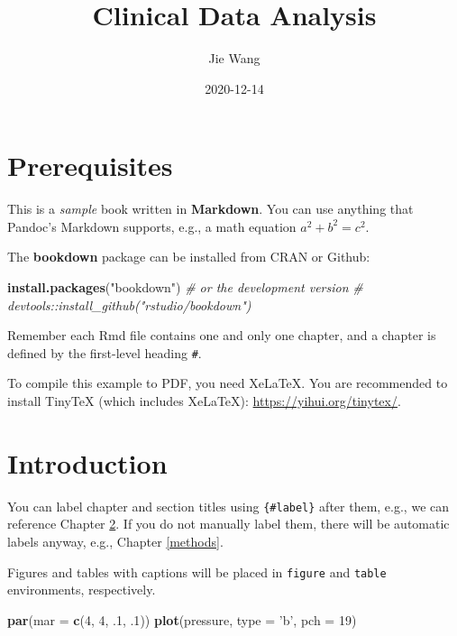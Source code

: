 \documentclass[
]{book}
\title{Clinical Data Analysis}
\author{Jie Wang}
\date{2020-12-14}
\newenvironment{Shaded}{\begin{snugshade}}{\end{snugshade}}
\newcommand{\CommentTok}[1]{\textcolor[rgb]{0.56,0.35,0.01}{\textit{#1}}}
\newcommand{\DataTypeTok}[1]{\textcolor[rgb]{0.13,0.29,0.53}{#1}}
\newcommand{\DecValTok}[1]{\textcolor[rgb]{0.00,0.00,0.81}{#1}}
\newcommand{\FloatTok}[1]{\textcolor[rgb]{0.00,0.00,0.81}{#1}}
\newcommand{\KeywordTok}[1]{\textcolor[rgb]{0.13,0.29,0.53}{\textbf{#1}}}
\newcommand{\NormalTok}[1]{#1}
\newcommand{\StringTok}[1]{\textcolor[rgb]{0.31,0.60,0.02}{#1}}
\begin{document}
\maketitle

{
\setcounter{tocdepth}{1}
\tableofcontents
}
\hypertarget{prerequisites}{%
\chapter{Prerequisites}\label{prerequisites}}

This is a \emph{sample} book written in \textbf{Markdown}. You can use anything that Pandoc's Markdown supports, e.g., a math equation \(a^2 + b^2 = c^2\).

The \textbf{bookdown} package can be installed from CRAN or Github:

\begin{Shaded}
\begin{Highlighting}[]
\KeywordTok{install.packages}\NormalTok{(}\StringTok{"bookdown"}\NormalTok{)}
\CommentTok{# or the development version}
\CommentTok{# devtools::install_github("rstudio/bookdown")}
\end{Highlighting}
\end{Shaded}

Remember each Rmd file contains one and only one chapter, and a chapter is defined by the first-level heading \texttt{\#}.

To compile this example to PDF, you need XeLaTeX. You are recommended to install TinyTeX (which includes XeLaTeX): \url{https://yihui.org/tinytex/}.

\hypertarget{intro}{%
\chapter{Introduction}\label{intro}}

You can label chapter and section titles using \texttt{\{\#label\}} after them, e.g., we can reference Chapter \ref{intro}. If you do not manually label them, there will be automatic labels anyway, e.g., Chapter \ref{methods}.

Figures and tables with captions will be placed in \texttt{figure} and \texttt{table} environments, respectively.

\begin{Shaded}
\begin{Highlighting}[]
\KeywordTok{par}\NormalTok{(}\DataTypeTok{mar =} \KeywordTok{c}\NormalTok{(}\DecValTok{4}\NormalTok{, }\DecValTok{4}\NormalTok{, }\FloatTok{.1}\NormalTok{, }\FloatTok{.1}\NormalTok{))}
\KeywordTok{plot}\NormalTok{(pressure, }\DataTypeTok{type =} \StringTok{'b'}\NormalTok{, }\DataTypeTok{pch =} \DecValTok{19}\NormalTok{)}
\end{Highlighting}
\end{Shaded}
\end{document}
